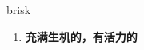 
\begin{frame}
{\huge brisk}
\begin{center}
\begin{enumerate}\Large
  \item \textbf{充满生机的，有活力的}
\end{enumerate}
\end{center}
\end{frame}
